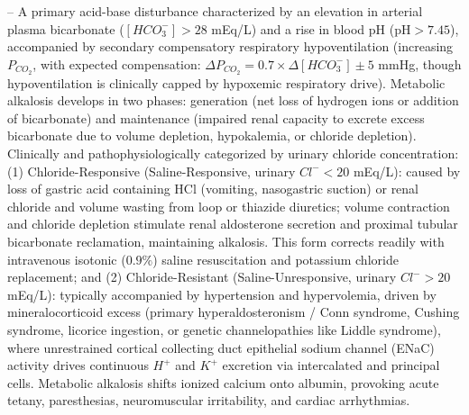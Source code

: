 -- A primary acid-base disturbance characterized by an elevation in arterial plasma bicarbonate ($[HCO_3^-] > 28$ mEq/L) and a rise in blood pH ($\text{pH} > 7.45$), accompanied by secondary compensatory respiratory hypoventilation (increasing $P_{CO_2}$, with expected compensation: $\Delta P_{CO_2} = 0.7 \times \Delta [HCO_3^-] \pm 5$ mmHg, though hypoventilation is clinically capped by hypoxemic respiratory drive). Metabolic alkalosis develops in two phases: generation (net loss of hydrogen ions or addition of bicarbonate) and maintenance (impaired renal capacity to excrete excess bicarbonate due to volume depletion, hypokalemia, or chloride depletion). Clinically and pathophysiologically categorized by urinary chloride concentration: (1) Chloride-Responsive (Saline-Responsive, urinary $Cl^- < 20$ mEq/L): caused by loss of gastric acid containing HCl (vomiting, nasogastric suction) or renal chloride and volume wasting from loop or thiazide diuretics; volume contraction and chloride depletion stimulate renal aldosterone secretion and proximal tubular bicarbonate reclamation, maintaining alkalosis. This form corrects readily with intravenous isotonic ($0.9\%$) saline resuscitation and potassium chloride replacement; and (2) Chloride-Resistant (Saline-Unresponsive, urinary $Cl^- > 20$ mEq/L): typically accompanied by hypertension and hypervolemia, driven by mineralocorticoid excess (primary hyperaldosteronism / Conn syndrome, Cushing syndrome, licorice ingestion, or genetic channelopathies like Liddle syndrome), where unrestrained cortical collecting duct epithelial sodium channel (ENaC) activity drives continuous $H^+$ and $K^+$ excretion via intercalated and principal cells. Metabolic alkalosis shifts ionized calcium onto albumin, provoking acute tetany, paresthesias, neuromuscular irritability, and cardiac arrhythmias.

